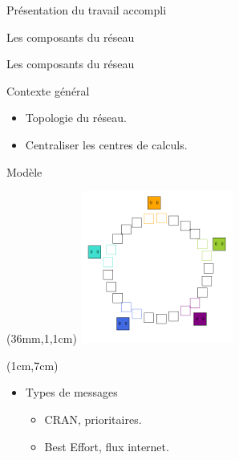 \documentclass[10 pt]{beamer}
\begin{document}
\begin{section}{Pr\'esentation du travail accompli}
\begin{subsection}{Les composants du r\'eseau}
\begin{frame}{Les composants du r\'eseau}
\vspace{3,5cm}

\begin{block}{Contexte g\'en\'eral}
 \begin{multicols}{2}
\begin{itemize}
\item Topologie du r\'eseau.
\item Centraliser les centres de calculs.

\end{itemize}
\end{multicols}
\end{block}

\end{frame}
 
\begin{frame}{Mod\`ele}
\begin{textblock*}{5cm}(36mm,1,1cm) %
\includegraphics [width=5cm]{logos/anneau_en_action.png}
\end{textblock*}


\vspace{4cm}


\begin{textblock*}{5cm}(1cm,7cm) %

\begin{itemize}
\item Types de messages
\begin{itemize}
\item CRAN, prioritaires.
\item Best Effort, flux internet.
\end{itemize}

\end{itemize}

\end{textblock*}

\end{frame}


\end{subsection}
\end{section}
\end{document}
